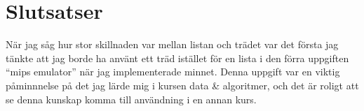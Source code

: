 \documentclass[a4paper,11pt]{article}
\begin{document}
\section*{Slutsatser}
När jag såg hur stor skillnaden var mellan listan och trädet var det första jag tänkte att jag borde ha använt ett träd istället för en lista i den förra uppgiften ``mips emulator'' när jag implementerade minnet. Denna uppgift var en viktig påminnnelse på det jag lärde mig i kursen data \& algoritmer, och det är roligt att se denna kunskap komma till användning i en annan kurs.
\end{document}
